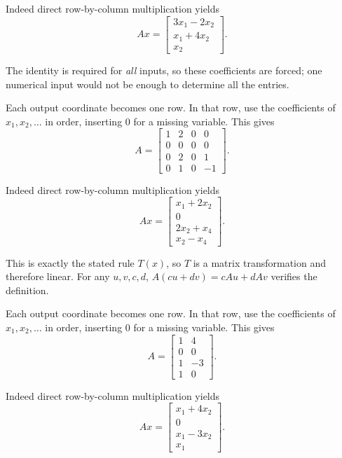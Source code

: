 Indeed direct row-by-column multiplication yields
\[ Ax=\begin{bmatrix}3 x_{1} - 2 x_{2}\\x_{1} + 4 x_{2}\\x_{2}\end{bmatrix}.\]

The identity is required for \emph{all} inputs, so these coefficients are forced; one numerical input would not be enough to determine all the entries.



Each output coordinate becomes one row. In that row, use the coefficients of $x_1,x_2,\ldots$ in order, inserting $0$ for a missing variable. This gives
\[ A=\begin{bmatrix}1 & 2 & 0 & 0\\0 & 0 & 0 & 0\\0 & 2 & 0 & 1\\0 & 1 & 0 & -1\end{bmatrix}.\]

Indeed direct row-by-column multiplication yields
\[ Ax=\begin{bmatrix}x_{1} + 2 x_{2}\\0\\2 x_{2} + x_{4}\\x_{2} - x_{4}\end{bmatrix}.\]

This is exactly the stated rule $T(x)$, so $T$ is a matrix transformation and therefore linear. For any $u,v,c,d$, $A(cu+dv)=cAu+dAv$ verifies the definition.



Each output coordinate becomes one row. In that row, use the coefficients of $x_1,x_2,\ldots$ in order, inserting $0$ for a missing variable. This gives
\[ A=\begin{bmatrix}1 & 4\\0 & 0\\1 & -3\\1 & 0\end{bmatrix}.\]

Indeed direct row-by-column multiplication yields
\[ Ax=\begin{bmatrix}x_{1} + 4 x_{2}\\0\\x_{1} - 3 x_{2}\\x_{1}\end{bmatrix}.\]

